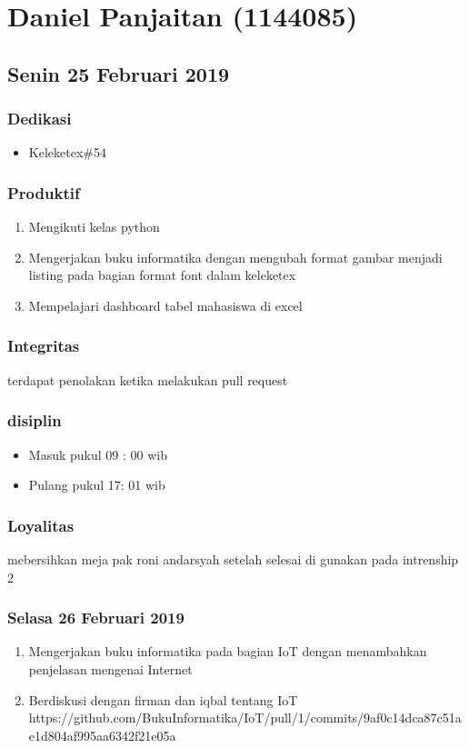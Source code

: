 \chapter{Daniel Panjaitan (1144085)}


\section{Senin 25 Februari 2019}
\subsection{Dedikasi}
\begin{itemize}
  \item Keleketex\#54
  \end{itemize}
\subsection{Produktif}
\begin{enumerate}
  \item Mengikuti kelas python
  \item Mengerjakan buku informatika dengan mengubah format gambar menjadi listing pada bagian format font dalam keleketex
  \item Mempelajari dashboard tabel mahasiswa di excel
\end{enumerate}
\subsection{Integritas}
terdapat penolakan ketika melakukan pull request
\subsection{disiplin}
\begin{itemize}
  \item Masuk pukul 09 : 00 wib
  \item Pulang pukul 17: 01 wib
\end{itemize}
\subsection{Loyalitas}
mebersihkan meja pak roni andarsyah setelah selesai di gunakan pada intrenship 2



\subsection{Selasa 26 Februari 2019}
\begin{enumerate}
  \item Mengerjakan buku informatika pada bagian IoT dengan menambahkan penjelasan mengenai Internet
  \item Berdiskusi dengan firman dan iqbal tentang IoT
  \subitem https://github.com/BukuInformatika/IoT/pull/1/commits/9af0c14dca87c51ae1d804af995aa6342f21e05a
\end{enumerate}

